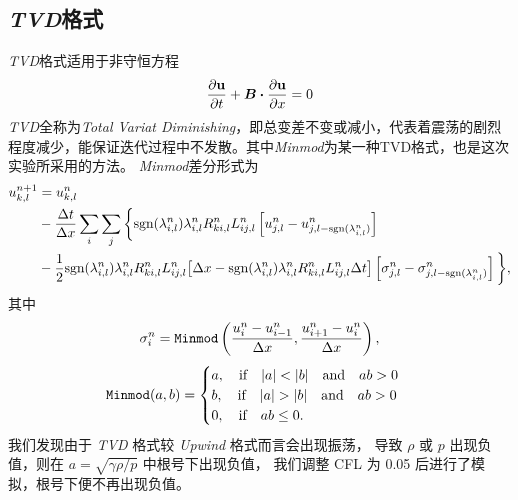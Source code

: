 \documentclass[10.5pt
]{article}
\begin{document}
\subsection{\textit{TVD}格式}
\textit{TVD}格式适用于非守恒方程
\begin{align}
\pdv{\vb u}{t} + \vb*B \vdot \pdv{\vb u}{x} = 0
\end{align}
\textit{TVD}全称为\textit{Total Variat Diminishing}，即总变差不变或减小，代表着震荡的剧烈程度减少，能保证迭代过程中不发散。其中\textit{Minmod}为某一种TVD格式，也是这次实验所采用的方法。
\textit{Minmod}差分形式为
\begin{equation}
\begin{aligned}
u_{k,l}^{n+1} &= u_{k,l}^n \\
& - \frac{\Delta t}{\Delta x} \sum_i \sum_j \bigg\{\text{sgn}(\lambda_{i,l}^n)
 \lambda_{i,l}^n R_{ki,l}^n L_{ij,l}^n \left[u_{j,l}^n - u_{j,l-\text{sgn}(\lambda_{i,l}^n)}^n\right]\\
& - \frac{1}{2}
\text{sgn}(\lambda_{i,l}^n) \lambda_{i,l}^n R_{ki,l}^n L_{ij,l}^n
	\qty[\Delta x-\text{sgn}(\lambda_{i,l}^n) \lambda_{i,l}^n R_{ki,l}^n L_{ij,l}^n \Delta t]
 \left[\sigma_{j,l}^n - \sigma_{j,l-\text{sgn}(\lambda_{i,l}^n)}^n\right]\bigg\},
\end{aligned}
\end{equation}
其中
\begin{equation}
	\sigma_i^n = \verb|Minmod| \left( \frac{u_i^n - u_{i-1}^{n}}{ \Delta x }, \frac{u_{i+1}^n - u_{i}^{n}}{ \Delta x } \right),
\end{equation}
\begin{equation}
	\verb|Minmod|(a, b) = 
	\begin{cases}
		a, \qif |a| < |b| \qand ab > 0\\
		b, \qif |a| > |b| \qand ab > 0\\
		0, \qif ab \leq 0.
	\end{cases}
\end{equation}
我们发现由于 \textit{TVD} 格式较 \textit{Upwind} 格式而言会出现振荡，
导致 \(\rho\) 或 \(p\) 出现负值，则在 \(a = \sqrt{\gamma \rho / p}\) 中根号下出现负值，
我们调整 CFL 为 0.05 后进行了模拟，根号下便不再出现负值。
\end{document}
